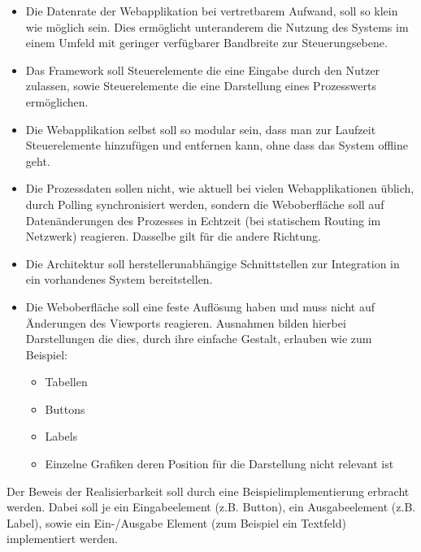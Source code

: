 \begin{itemize}
    \item   Die Datenrate der Webapplikation bei vertretbarem Aufwand, soll so klein wie möglich sein.
            Dies ermöglicht unteranderem die Nutzung des Systems im einem Umfeld mit geringer verfügbarer Bandbreite zur Steuerungsebene.
    \item   Das Framework soll Steuerelemente die eine Eingabe durch den Nutzer zulassen, sowie Steuerelemente die eine Darstellung eines Prozesswerts ermöglichen.
    \item   Die Webapplikation selbst soll so modular sein, dass man zur Laufzeit Steuerelemente hinzufügen und entfernen kann, ohne dass das System offline geht.
    \item   Die Prozessdaten sollen nicht, wie aktuell bei vielen Webapplikationen üblich, durch Polling synchronisiert werden, sondern die Weboberfläche soll auf Datenänderungen des Prozesses in Echtzeit (bei statischem Routing im Netzwerk) reagieren. Dasselbe gilt für die andere Richtung.
    \item   Die Architektur soll herstellerunabhängige Schnittstellen zur Integration in ein vorhandenes System bereitstellen.
    \item   Die Weboberfläche soll eine feste Auflösung haben und muss nicht auf Änderungen des Viewports reagieren. Ausnahmen bilden hierbei Darstellungen die dies, durch ihre einfache Gestalt, erlauben wie zum Beispiel:
            \begin{itemize}
                \item Tabellen
                \item Buttons
                \item Labels
                \item Einzelne Grafiken deren Position für die Darstellung nicht relevant ist
            \end{itemize}
\end{itemize}
Der Beweis der Realisierbarkeit soll durch eine Beispielimplementierung erbracht werden.
Dabei soll je ein Eingabeelement (z.B. Button), ein Ausgabeelement (z.B. Label), sowie ein Ein-/Ausgabe Element (zum Beispiel ein Textfeld) implementiert werden.
